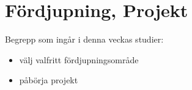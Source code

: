 \chapter{Fördjupning, Projekt}\label{chapter:W12}
Begrepp som ingår i denna veckas studier:
\begin{itemize}[noitemsep,label={$\square$},leftmargin=*]
\item välj valfritt fördjupningsområde
\item påbörja projekt\end{itemize}
